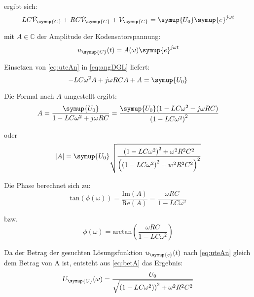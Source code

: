     ergibt sich:
    \begin{equation}
        LC \ddot{V}_{\symup{C}} + RC \dot{V}_{\symup{C}} + V_{\symup{C}} = \symup{U_0} \symup{e}^{j \omega t} 
        \label{eq:angDGL}
    \end{equation}

    mit $A \in  \mathds{C}$ der Amplitude der Kodensatorspannung:
    \begin{equation}
        u_{\symup{C}} (t) = A(\omega) \symup{e}^{j \omega t} 
        \label{eq:uteAn}
    \end{equation}

    Einsetzen von \ref{eq:uteAn} in \ref{eq:angDGL} liefert:
    \begin{equation}
        -LC \omega^2 A + j\omega RC A +A = \symup{U_0} \nonumber
    \end{equation}

    Die Formal nach $A$ umgestellt ergibt:
    \begin{equation}
        A= \frac{\symup{U_0}}{1 - LC \omega^2 + j \omega RC} = \frac{ \symup{U_0}(1 -LC \omega^2 - j\omega RC)}{\left( 1- LC \omega^2 \right)^2} \nonumber
    \end{equation}
    
    oder
    \begin{equation}
        |A|= \symup{U_0} \sqrt{\frac{\left(1-LC\omega^2\right)^2 + \omega^2 R^2C^2}{\left( \left(1 -LC \omega^2\right)^2 +w^2R^2C^2 \right)^2}}
        \label{eq:betA}
    \end{equation}

    Die Phase berechnet sich zu:
    \begin{equation}
        \text{tan}(\phi (\omega)) = \frac{\text{Im}(A)}{\text{Re}(A)} = \frac{\omega RC}{1 - LC\omega^2} \nonumber
    \end{equation}

    bzw.
    \begin{equation}
        \phi (\omega) = \text{arctan}\left(\frac{\omega RC}{1 - LC\omega^2} \right)
        \label{eq:phi}
    \end{equation}

    Da der Betrag der gesuchten Lösungsfunktion $u_{\symup{c}}(t)$ nach \ref{eq:uteAn} gleich dem Betrag von A ist, entsteht aus 
    \ref{eq:betA} das Ergebnis:
    \begin{equation}
        U_{\symup{C}}(\omega) = \frac{U_0}{\sqrt{\left(1-LC\omega^2)\right)^2 + \omega^2 R^2 C^2}} 
        \label{eq:Ucw}
    \end{equation}

